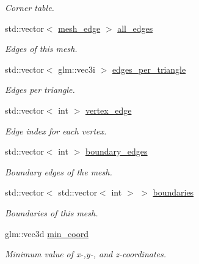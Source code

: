\begin{DoxyCompactItemize}
\begin{DoxyCompactList}\small\item\em Corner table. \end{DoxyCompactList}\item 
std\+::vector$<$ \hyperlink{classgeoproc_1_1mesh__edge}{mesh\+\_\+edge} $>$ \hyperlink{classgeoproc_1_1TriangleMesh_ab10f052ad932cd78056a55b58ddd475c}{all\+\_\+edges}
\begin{DoxyCompactList}\small\item\em Edges of this mesh. \end{DoxyCompactList}\item 
std\+::vector$<$ glm\+::vec3i $>$ \hyperlink{classgeoproc_1_1TriangleMesh_abd4a23d389a000a75666afad50387a6f}{edges\+\_\+per\+\_\+triangle}
\begin{DoxyCompactList}\small\item\em Edges per triangle. \end{DoxyCompactList}\item 
std\+::vector$<$ int $>$ \hyperlink{classgeoproc_1_1TriangleMesh_abbc25699f67776fc99c909124b0c584a}{vertex\+\_\+edge}
\begin{DoxyCompactList}\small\item\em Edge index for each vertex. \end{DoxyCompactList}\item 
std\+::vector$<$ int $>$ \hyperlink{classgeoproc_1_1TriangleMesh_a142a764ddf07b98c7efcd596d88c3f87}{boundary\+\_\+edges}
\begin{DoxyCompactList}\small\item\em Boundary edges of the mesh. \end{DoxyCompactList}\item 
std\+::vector$<$ std\+::vector$<$ int $>$ $>$ \hyperlink{classgeoproc_1_1TriangleMesh_a57162eac37831c87786a8dab8331d72f}{boundaries}
\begin{DoxyCompactList}\small\item\em Boundaries of this mesh. \end{DoxyCompactList}\item 
\mbox{\label{classgeoproc_1_1TriangleMesh_abbde1dd2f3c76af9fe3b5bca764c8827}} 
glm\+::vec3d \hyperlink{classgeoproc_1_1TriangleMesh_abbde1dd2f3c76af9fe3b5bca764c8827}{min\+\_\+coord}
\begin{DoxyCompactList}\small\item\em Minimum value of x-\/,y-\/, and z-\/coordinates. \end{DoxyCompactList}\item 

\end{DoxyCompactItemize}
